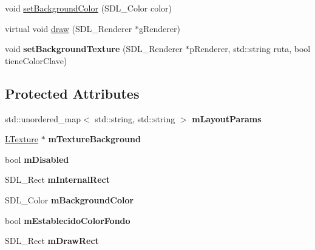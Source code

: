 \begin{DoxyCompactItemize}
\item 
void \hyperlink{class_component_a0df4f4d3aaac6083dc6fe7c9ec1e9435}{set\+Background\+Color} (S\+D\+L\+\_\+\+Color color)
\item 
virtual void \hyperlink{class_component_ab1ea202c9ef8933d15956b96cfe281a1}{draw} (S\+D\+L\+\_\+\+Renderer $\ast$g\+Renderer)
\item 
void {\bfseries set\+Background\+Texture} (S\+D\+L\+\_\+\+Renderer $\ast$p\+Renderer, std\+::string ruta, bool tiene\+Color\+Clave)\hypertarget{class_component_af5266ecac7180548cf2282377ca70752}{}\label{class_component_af5266ecac7180548cf2282377ca70752}

\end{DoxyCompactItemize}
\subsection*{Protected Attributes}
\begin{DoxyCompactItemize}
\item 
std\+::unordered\+\_\+map$<$ std\+::string, std\+::string $>$ {\bfseries m\+Layout\+Params}\hypertarget{class_component_aa57d48b13ce8d6d0cbad5d2df25855e9}{}\label{class_component_aa57d48b13ce8d6d0cbad5d2df25855e9}

\item 
\hyperlink{class_l_texture}{L\+Texture} $\ast$ {\bfseries m\+Texture\+Background}\hypertarget{class_component_a1146357f9295249aa37d441a1055cfcb}{}\label{class_component_a1146357f9295249aa37d441a1055cfcb}

\item 
bool {\bfseries m\+Disabled}\hypertarget{class_component_a31f905a630a60deb299a3c598de040eb}{}\label{class_component_a31f905a630a60deb299a3c598de040eb}

\item 
S\+D\+L\+\_\+\+Rect {\bfseries m\+Internal\+Rect}\hypertarget{class_component_ab29a46348bb17e085bc2d204b5e9809f}{}\label{class_component_ab29a46348bb17e085bc2d204b5e9809f}

\item 
S\+D\+L\+\_\+\+Color {\bfseries m\+Background\+Color}\hypertarget{class_component_a0eeef3ba6bce588f0908cbaa34113c42}{}\label{class_component_a0eeef3ba6bce588f0908cbaa34113c42}

\item 
bool {\bfseries m\+Establecido\+Color\+Fondo}\hypertarget{class_component_a17b8acdefc67020f12ade56dedb070ce}{}\label{class_component_a17b8acdefc67020f12ade56dedb070ce}

\item 
S\+D\+L\+\_\+\+Rect {\bfseries m\+Draw\+Rect}\hypertarget{class_component_a6182ec25ba26a0d1616662e547ed4afe}{}\label{class_component_a6182ec25ba26a0d1616662e547ed4afe}

\end{DoxyCompactItemize}


